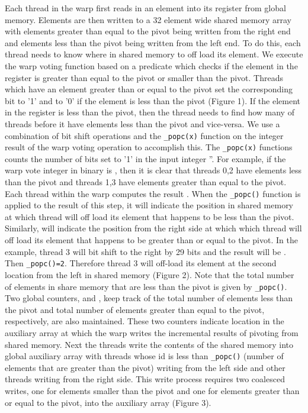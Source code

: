 \documentclass[10pt]{article}
\begin{document}
Each thread in the warp first reads in an element into its register from global memory. Elements are then written to a 32 element wide shared memory array with elements greater than equal to the pivot being written from the right end and elements less than the pivot being written from the left end. To do this, each thread needs to know where in shared memory to off load its element.  We execute the warp voting function based on a predicate which checks if the element in the register is greater than equal to the pivot or smaller than the pivot.  Threads which have an element greater than or equal to the pivot set the corresponding bit to '1' and to '0' if the element is less than the pivot (Figure 1). If the element in the register is less than the pivot, then the thread needs to find how many of threads before it have elements less than the pivot and vice-versa. We use a combination of bit shift operations and the \texttt{\_popc(x)} function on the integer result of the warp voting operation to accomplish this. The \texttt{\_popc(x)} functions counts the number of bits set to '1' in the input integer ''. For example, if the warp vote integer in binary is , then it is clear that threads 0,2  have elements less than the pivot and threads 1,3 have elements greater than equal to the pivot. Each thread  within the warp computes the result .  When the  \texttt{\_popc()} function is applied to the result of this step, it will indicate the position in shared memory at which thread  will off load its element that happens to be less than the pivot. Similarly,  will indicate the position from the right side at which which thread  will off load its element that happens to be greater than or equal to the pivot. In the example, thread 3 will bit shift  to the right by 29 bits and the result will be . Then \texttt{\_popc()=2}. Therefore thread 3 will off-load its element at the second location from the left in shared memory (Figure 2).  Note that the total number of elements in share memory that are less than the pivot is given by \texttt{\_popc()}. Two global counters,  and , keep track of the total number of elements less than the pivot and total number of elements greater than equal to the pivot, respectively, are also maintained. These two counters indicate location in the auxiliary array at which the warp writes the incremental results of pivoting from shared memory.  Next the threads write the contents of the shared memory into global auxiliary array with threads whose id is less than \texttt{\_popc()} (number of elements that are greater than the pivot) writing from the left side and other threads writing from the right side. This write process requires two coalesced writes, one for elements smaller than the pivot and one for elements greater than or equal to the pivot, into the auxiliary array (Figure 3). \\
\end{document}
